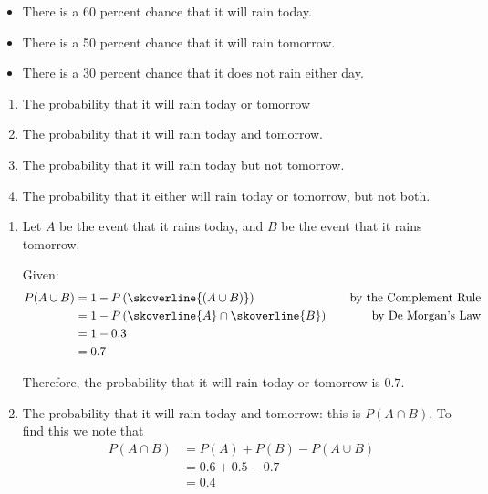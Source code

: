 \begin{example}
    \begin{itemize}
    \item There is a 60 percent chance that it will rain today.
    \item There is a 50 percent chance that it will rain tomorrow.
    \item There is a 30 percent chance that it does not rain either day.
    \end{itemize}
    
\begin{enumerate}[label=(\alph*)]
    \item The probability that it will rain today or tomorrow
    \item The probability that it will rain today and tomorrow.
    \item The probability that it will rain today but not tomorrow.
    \item The probability that it either will rain today or tomorrow, but not both.
\end{enumerate}
    
\begin{solution}
\begin{enumerate}[label=(\alph*)]
    \item     Let \( A \) be the event that it rains today, and \( B \) be the event that it rains tomorrow.
        
    Given:
    \begin{align*}
        P(A \cup B) &= 1 - P\left(\skoverline{(A \cup B)}\right) \quad &\text{by the Complement Rule} \\
                &= 1 - P\left(\skoverline{A} \cap \skoverline{B}\right) \quad &\text{by De Morgan's Law} \\
                &= 1 - 0.3 \\
                &= 0.7
    \end{align*}
            
        
    Therefore, the probability that it will rain today or tomorrow is \( 0.7 \).

    \item The probability that it will rain today and tomorrow: this is $P(A \cap B)$. To find this we note that
    \begin{align*}
    P(A \cap B) &= P(A) + P(B) - P(A \cup B) \\
                &= 0.6 + 0.5 - 0.7 \\
                &= 0.4
    \end{align*}


\end{enumerate}
\end{solution}
\end{example}
